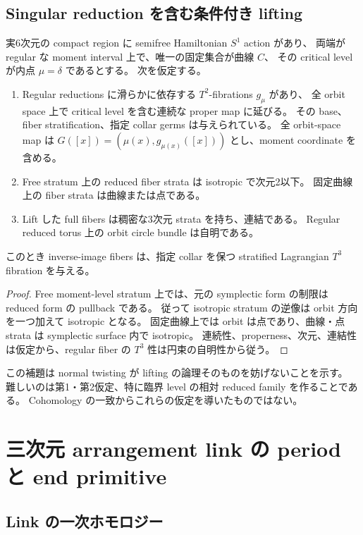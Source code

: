 \subsection{Singular reduction を含む条件付き lifting}

\begin{lemma}\label{lem:singular-lift}
実6次元の compact region に semifree Hamiltonian $S^1$ action があり、
両端が regular な moment interval 上で、唯一の固定集合が曲線 $C$、
その critical level が内点 $\mu=\delta$ であるとする。
次を仮定する。
\begin{enumerate}
\item Regular reductions に滑らかに依存する $T^2$-fibrations $g_\mu$ があり、
全 orbit space 上で critical level を含む連続な proper map に延びる。
その base、fiber stratification、指定 collar germs は与えられている。
全 orbit-space map は $G([x])=(\mu(x),g_{\mu(x)}([x]))$ とし、moment coordinate を含める。
\item Free stratum 上の reduced fiber strata は isotropic で次元2以下。
固定曲線上の fiber strata は曲線または点である。
\item Lift した full fibers は稠密な3次元 strata を持ち、連結である。
Regular reduced torus 上の orbit circle bundle は自明である。
\end{enumerate}
このとき inverse-image fibers は、指定 collar を保つ stratified Lagrangian $T^3$ fibration を与える。
\end{lemma}

\begin{proof}
Free moment-level stratum 上では、元の symplectic form の制限は reduced form の pullback である。
従って isotropic stratum の逆像は orbit 方向を一つ加えて isotropic となる。
固定曲線上では orbit は点であり、曲線・点 strata は symplectic surface 内で isotropic。
連続性、properness、次元、連結性は仮定から、regular fiber の $T^3$ 性は円束の自明性から従う。
\end{proof}

この補題は normal twisting が lifting の論理そのものを妨げないことを示す。
難しいのは第1・第2仮定、特に臨界 level の相対 reduced family を作ることである。
Cohomology の一致からこれらの仮定を導いたものではない。

\section{三次元 arrangement link の period と end primitive}\label{sec:link}

\subsection{Link の一次ホモロジー}

